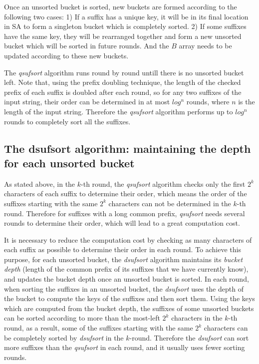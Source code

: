 \documentclass{ws-ijprai}
\begin{document}
Once an unsorted bucket is sorted, new buckets are formed according to
the following two cases: 1) If a suffix has a unique key, it will be
in its final location in SA to form a singleton bucket which is
completely sorted. 2) If some suffixes have the same key, they will be
rearranged together and form a new unsorted bucket which will be
sorted in future rounds. And the $B$ array needs to be updated
according to these new buckets.

The \emph{qsufsort} algorithm runs round by round untill there is no
unsorted bucket left. Note that, using the prefix doubling technique,
the length of the checked prefix of each suffix is doubled after each
round, so for any two suffixes of the input string, their order can
be determined in at most $log^n$ rounds, where $n$ is the length of
the input string. Therefore the \emph{qsufsort} algorithm performs up
to $log^n$ rounds to completely sort all the suffixes.

\subsection{The dsufsort algorithm: maintaining the depth for
each unsorted bucket}
\label{sec:dsufsort}

As stated above, in the $k$-th round, the \emph{qsufsort} algorithm
checks only the first $2^k$ characters of each suffix to determine
their order, which means the order of the suffixes starting with the same
$2^k$ characters can not be determined in the $k$-th round. Therefore
for suffixes with a long common prefix, \emph{qsufsort} needs several
rounds to determine their order, which will lead to a great
computation cost.

It is necessary to reduce the computation cost by checking as many
characters of each suffix as possible to determine their order in each
round. To achieve this purpose, for each unsorted bucket, the
\emph{dsufsort} algorithm maintains its \emph{bucket depth} (length of
the common prefix of its suffixes that we have currently know), and
updates the bucket depth once an unsorted bucket is sorted. In each
round, when sorting the suffixes in an unsorted bucket, the
\emph{dsufsort} uses the depth of the bucket to compute the keys of
the suffixes and then sort them.  Using the keys which are computed
from the bucket depth, the suffixes of some unsorted buckets can be
sorted according to more than the most-left $2^k$ characters in the
$k$-th round, as a result, some of the suffixes starting with the same
$2^k$ characters can be completely sorted by \emph{dsufsort} in the
$k$-round. Therefore the \emph{dsufsort} can sort more suffixes than
the \emph{qsufsort} in each round, and it usually uses fewer sorting
rounds.
\end{document}
